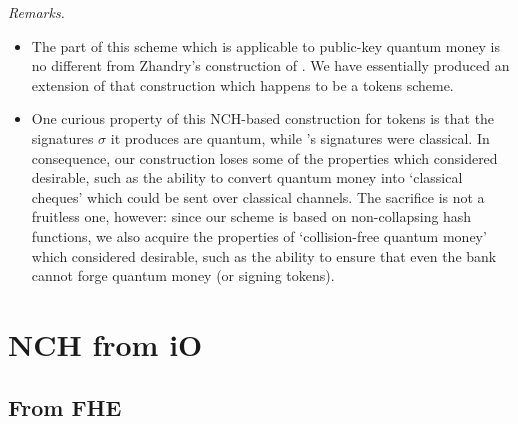 \documentclass{article}
\begin{document}
\noindent \textit{Remarks.}
\begin{itemize}
    \item The part of this scheme which is applicable to public-key quantum money is no different from Zhandry's construction of \cite{zha17}. We have essentially produced an extension of that construction which happens to be a tokens scheme.
    \item One curious property of this NCH-based construction for tokens is that the signatures $\sigma$ it produces are quantum, while \cite{tokens}'s signatures were classical. In consequence, our construction loses some of the properties which \cite{tokens} considered desirable, such as the ability to convert quantum money into `classical cheques' which could be sent over classical channels. The sacrifice is not a fruitless one, however: since our scheme is based on non-collapsing hash functions, we also acquire the properties of `collision-free quantum money' which \cite{zha17} considered desirable, such as the ability to ensure that even the bank cannot forge quantum money (or signing tokens).
\end{itemize}

\section{NCH from iO}

\subsection{From FHE}
\end{document}
